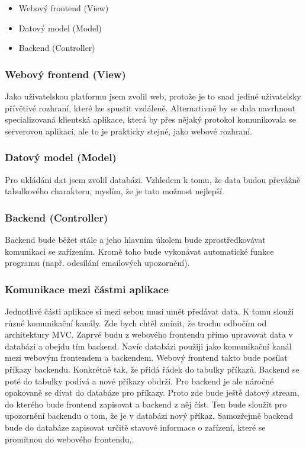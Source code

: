 \documentclass[12pt, a4paper, oneside]{article}
\begin{document}
\begin{itemize}
\item Webový frontend (View)
\item Datový model (Model)
\item Backend (Controller)
\end{itemize}

\subsubsection{Webový frontend (View)}

Jako uživatelskou platformu jsem zvolil web, protože je to snad jediné uživatelsky přívětivé rozhraní, které lze spustit vzdáleně.
Alternativně by se dala navrhnout specializovaná klientská aplikace, která by přes nějaký protokol komunikovala se serverovou aplikací, ale to je prakticky stejné, jako webové rozhraní. 



\subsubsection{Datový model (Model)}

Pro ukládáni dat jsem zvolil databázi. Vzhledem k tomu, že data budou převážně tabulkového charakteru, myslím, že je tato možnost nejlepší.

\subsubsection{Backend (Controller)}

Backend bude běžet stále a jeho hlavním úkolem bude zprostředkovávat komunikaci se zařízením. Kromě toho bude vykonávat automatické funkce programu (např. odesílání emailových upozornění).

\subsubsection{Komunikace mezi částmi aplikace}

Jednotlivé části aplikace si mezi sebou musí umět předávat data. K tomu slouží různé komunikační kanály.
Zde bych chtěl zmínit, že trochu odbočím od architektury MVC. Zaprvé budu z webového frontendu přímo upravovat data v databázi a obejdu tím backend.
Navíc databázi použiji jako komunikační kanál mezi webovým frontendem a backendem. Webový frontend takto bude posílat příkazy backendu. Konkrétně tak, že přidá řádek do tabulky příkazů.
Backend se poté do tabulky podívá a nové příkazy obdrží. Pro backend je ale náročné opakovaně se dívat do databáze pro příkazy. Proto zde bude ještě datový stream, do kterého bude frontend
zapisovat a backend z něj číst. Ten bude sloužit pro upozornění backendu o tom, že je v databázi nový příkaz.
Samozřejmě backend bude do databáze zapisovat určitě stavové informace o zařízení, které se promítnou do webového frontendu,.
\end{document}
